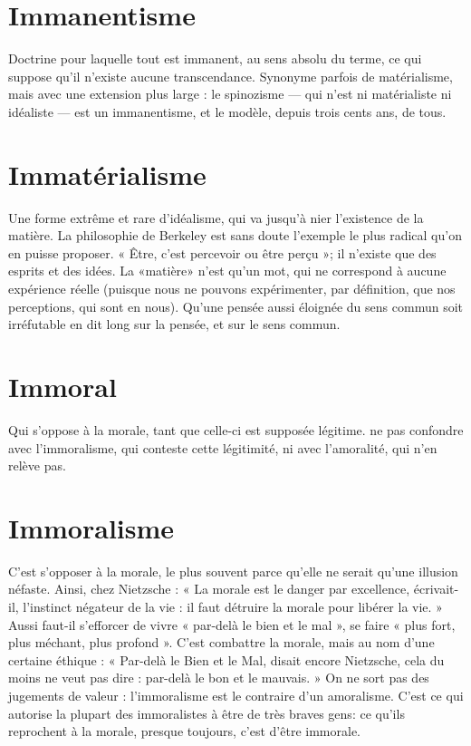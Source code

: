 \section{Immanentisme}
Doctrine pour laquelle tout est immanent, au sens
absolu du terme, ce qui suppose qu’il n'existe aucune
transcendance. Synonyme parfois de matérialisme, mais avec une extension
plus large : le spinozisme — qui n’est ni matérialiste ni idéaliste — est un immanentisme,
et le modèle, depuis trois cents ans, de tous.

\section{Immatérialisme}
Une forme extrême et rare d’idéalisme, qui va jusqu’à
nier l'existence de la matière. La philosophie de Berkeley
est sans doute l’exemple le plus radical qu’on en puisse proposer. « Être,
c’est percevoir ou être perçu »; il n'existe que des esprits et des idées. La
«matière» n’est qu’un mot, qui ne correspond à aucune expérience réelle
(puisque nous ne pouvons expérimenter, par définition, que nos perceptions,
qui sont en nous). Qu’une pensée aussi éloignée du sens commun soit irréfutable
en dit long sur la pensée, et sur le sens commun.

\section{Immoral}
Qui s’oppose à la morale, tant que celle-ci est supposée légitime.
ne pas confondre avec l’immoralisme, qui conteste cette légitimité,
ni avec l’amoralité, qui n’en relève pas.

\section{Immoralisme}
C’est s’opposer à la morale, le plus souvent parce qu’elle
ne serait qu’une illusion néfaste. Ainsi, chez Nietzsche :
« La morale est le danger par excellence, écrivait-il, l'instinct négateur de la vie :
il faut détruire la morale pour libérer la vie. » Aussi faut-il s’efforcer de vivre
« par-delà le bien et le mal », se faire « plus fort, plus méchant, plus profond ».
C’est combattre la morale, mais au nom d’une certaine éthique : « Par-delà le
Bien et le Mal, disait encore Nietzsche, cela du moins ne veut pas dire : par-delà
le bon et le mauvais. » On ne sort pas des jugements de valeur : l’immoralisme
est le contraire d’un amoralisme. C’est ce qui autorise la plupart des
immoralistes à être de très braves gens: ce qu’ils reprochent à la morale,
presque toujours, c’est d’être immorale.

